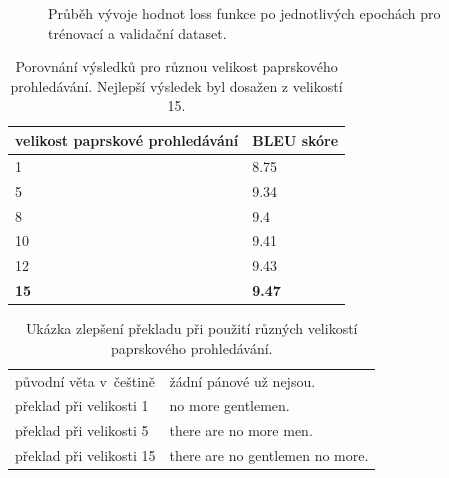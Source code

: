 \begin{figure}[H]
    \begin{center}
    \end{center}
	\caption{Průběh vývoje hodnot loss funkce po jednotlivých epochách pro trénovací a validační dataset.}
\end{figure}

\begin{table}[H]
    \begin{center}
        \begin{tabular}{ll}
          \toprule
          velikost paprskové prohledávání & BLEU skóre \\
          \midrule
          1 & 8.75 \\
          5 & 9.34 \\
          8 & 9.4 \\
          10 & 9.41 \\
          12 & 9.43 \\
          \textbf{15} & \textbf{9.47} \\
          \bottomrule
        \end{tabular}
    \end{center}
	\caption{Porovnání výsledků pro různou velikost paprskového prohledávání. Nejlepší výsledek byl dosažen z velikostí 15.}
	\label{table:resultsExperiment4}
\end{table}

\begin{table}[H]
    \begin{center}
        \begin{tabular}{ll}
          \toprule
          původní věta v~češtině & žádní pánové už nejsou. \\
          překlad při velikosti 1 & no more gentlemen. \\
          překlad při velikosti 5 & there are no more men. \\
          překlad při velikosti 15 & there are no gentlemen no more. \\
          \bottomrule
        \end{tabular}
    \end{center}
	\caption{Ukázka zlepšení překladu při použití různých velikostí paprskového prohledávání.}
	\label{table:beamTranslation}
\end{table}

